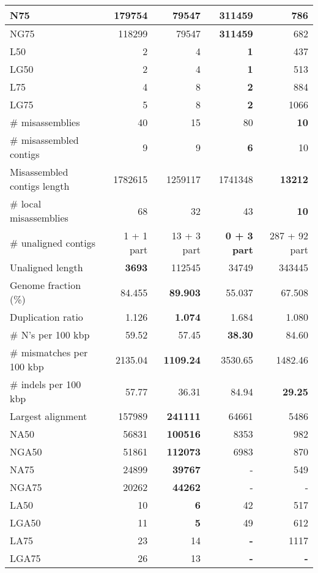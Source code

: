 \documentclass[12pt,a4paper]{article}
\begin{document}
\begin{table}[ht]
\begin{center}
\begin{tabular}{|l*{4}{|r}|}
N75 & 179754 & 79547 & {\bf 311459} & 786 \\ \hline
NG75 & 118299 & 79547 & {\bf 311459} & 682 \\ \hline
L50 & 2 & 4 & {\bf 1} & 437 \\ \hline
LG50 & 2 & 4 & {\bf 1} & 513 \\ \hline
L75 & 4 & 8 & {\bf 2} & 884 \\ \hline
LG75 & 5 & 8 & {\bf 2} & 1066 \\ \hline
\# misassemblies & 40 & 15 & 80 & {\bf 10} \\ \hline
\# misassembled contigs & 9 & 9 & {\bf 6} & 10 \\ \hline
Misassembled contigs length & 1782615 & 1259117 & 1741348 & {\bf 13212} \\ \hline
\# local misassemblies & 68 & 32 & 43 & {\bf 10} \\ \hline
\# unaligned contigs & 1 + 1 part & 13 + 3 part & {\bf 0 + 3 part} & 287 + 92 part \\ \hline
Unaligned length & {\bf 3693} & 112545 & 34749 & 343445 \\ \hline
Genome fraction (\%) & 84.455 & {\bf 89.903} & 55.037 & 67.508 \\ \hline
Duplication ratio & 1.126 & {\bf 1.074} & 1.684 & 1.080 \\ \hline
\# N's per 100 kbp & 59.52 & 57.45 & {\bf 38.30} & 84.60 \\ \hline
\# mismatches per 100 kbp & 2135.04 & {\bf 1109.24} & 3530.65 & 1482.46 \\ \hline
\# indels per 100 kbp & 57.77 & 36.31 & 84.94 & {\bf 29.25} \\ \hline
Largest alignment & 157989 & {\bf 241111} & 64661 & 5486 \\ \hline
NA50 & 56831 & {\bf 100516} & 8353 & 982 \\ \hline
NGA50 & 51861 & {\bf 112073} & 6983 & 870 \\ \hline
NA75 & 24899 & {\bf 39767} & - & 549 \\ \hline
NGA75 & 20262 & {\bf 44262} & - & - \\ \hline
LA50 & 10 & {\bf 6} & 42 & 517 \\ \hline
LGA50 & 11 & {\bf 5} & 49 & 612 \\ \hline
LA75 & 23 & 14 & {\bf -} & 1117 \\ \hline
LGA75 & 26 & 13 & {\bf -} & {\bf -} \\ \hline
\end{tabular}
\end{center}
\end{table}
\end{document}
